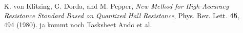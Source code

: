 \begin{thebibliography}{99}
     K. von Klitzing, G. Dorda, and M. Pepper, \emph{New Method for High-Accuracy
    Resistance Standard Based on Quantized Hall Resistance}, Phys. Rev. Lett. \textbf{45}, 494 (1980).
     ja kommt noch
     Tasksheet
     Ando et al.
\end{thebibliography}